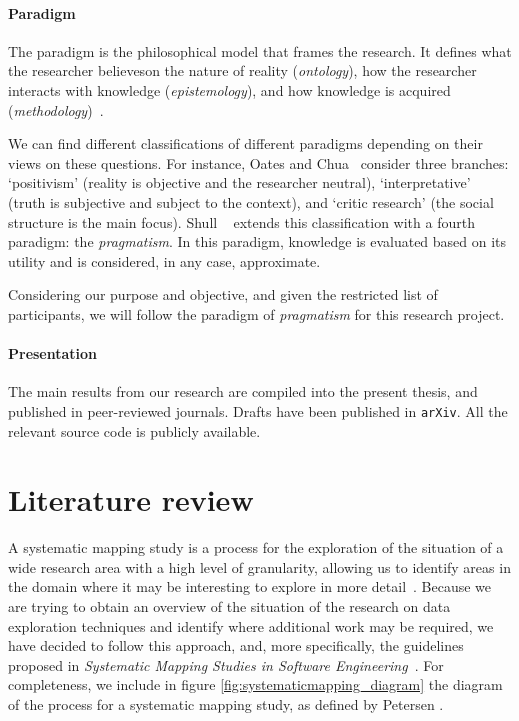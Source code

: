 \paragraph{Paradigm}
\label{method:paradigm}
The paradigm is the philosophical model that frames the research.
It defines what the researcher believes\footnotemark on the nature
of reality (\emph{ontology}), how the researcher interacts with
knowledge (\emph{epistemology}), and how knowledge is acquired
(\emph{methodology})~\cite{Guba1990}.

We can find different classifications of different paradigms depending on
their views on these questions. For instance, Oates and Chua~\cite{Chua1986}
consider three branches: `positivism' (reality is objective and the researcher neutral),
`interpretative' (truth is subjective and subject to the context), and
`critic research' (the social structure is the main focus).
Shull \etal~\cite{Shull2008} extends this classification with a fourth paradigm:
the \emph{pragmatism}. In this paradigm, knowledge is evaluated based on its
utility and is considered, in any case, approximate.

Considering our purpose and objective, and given the restricted list of
participants, we will follow the paradigm of \emph{pragmatism} for this research project.

\paragraph{Presentation}
\label{method:presentation}
The main results from our research are compiled into the present thesis,
and published in peer-reviewed journals. Drafts have been published in \texttt{arXiv}.
All the relevant source code is publicly available.

\section{Literature review}
\label{sec:method_literature_review}
A systematic mapping study is a process for the exploration of the
situation of a wide research area with a high level of granularity,
allowing us to identify areas in the domain where it may be interesting to
explore in more detail~\cite{Kitchenham2007}. Because we are trying to obtain
an overview of the situation of the research on data exploration techniques
and identify where additional work may be required, we have decided to follow this
approach, and, more specifically, the guidelines proposed in
\emph{Systematic Mapping Studies in Software Engineering}~\cite{Petersen2007}.
For completeness, we include in figure \ref{fig:systematicmapping_diagram} the
diagram of the process for a systematic mapping study, as defined by
Petersen \etal.

